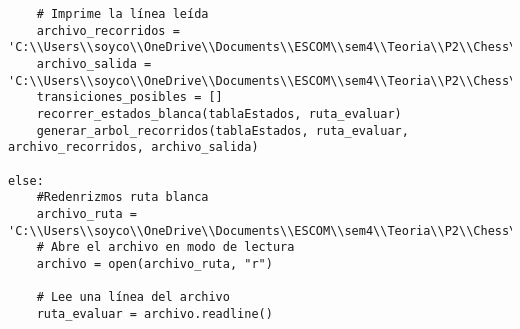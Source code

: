 \begin{lstlisting}
    # Imprime la línea leída
    archivo_recorridos = 'C:\\Users\\soyco\\OneDrive\\Documents\\ESCOM\\sem4\\Teoria\\P2\\Chess\\output\\recorridos_blanca.txt'
    archivo_salida = 'C:\\Users\\soyco\\OneDrive\\Documents\\ESCOM\\sem4\\Teoria\\P2\\Chess\\output\\arbol_blanca.dot'
    transiciones_posibles = []
    recorrer_estados_blanca(tablaEstados, ruta_evaluar)
    generar_arbol_recorridos(tablaEstados, ruta_evaluar, archivo_recorridos, archivo_salida)
    
else:
    #Redenrizmos ruta blanca
    archivo_ruta = 'C:\\Users\\soyco\\OneDrive\\Documents\\ESCOM\\sem4\\Teoria\\P2\\Chess\\output\\ruta_blanca.txt'
    # Abre el archivo en modo de lectura
    archivo = open(archivo_ruta, "r")

    # Lee una línea del archivo
    ruta_evaluar = archivo.readline()


\end{lstlisting}
